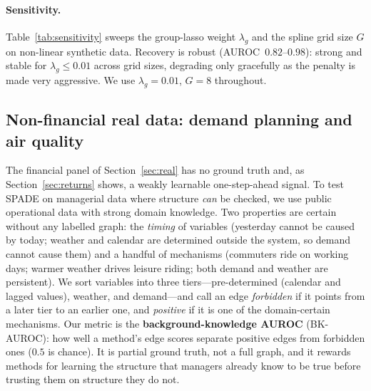 \paragraph{Sensitivity.}
\label{sec:sensitivity}
Table~\ref{tab:sensitivity} sweeps the group-lasso weight $\lambda_g$ and the
spline grid size $G$ on non-linear synthetic data. Recovery is robust
(AUROC~$0.82$--$0.98$): strong and stable for $\lambda_g\!\le\!0.01$ across grid
sizes, degrading only gracefully as the penalty is made very aggressive. We use
$\lambda_g{=}0.01$, $G{=}8$ throughout.

\begin{table}[t]
\centering
\caption{Sensitivity of SPADE to the group-lasso weight $\lambda_g$ and spline
grid size $G$ on non-linear synthetic data (mean over 3 seeds).}
\label{tab:sensitivity}
\end{table}

\subsection{Non-financial real data: demand planning and air quality}
\label{sec:bike}

The financial panel of Section~\ref{sec:real} has no ground truth and, as
Section~\ref{sec:returns} shows, a weakly learnable one-step-ahead signal. To
test SPADE on managerial data where structure \emph{can} be checked, we use public
operational data with strong domain knowledge. Two properties are certain without
any labelled graph: the \emph{timing} of variables (yesterday cannot be caused by
today; weather and calendar are determined outside the system, so demand cannot
cause them) and a handful of mechanisms (commuters ride on working days;
warmer weather drives leisure riding; both demand and weather are persistent).
We sort variables into three tiers---pre-determined (calendar and lagged
values), weather, and demand---and call an edge \emph{forbidden} if it points
from a later tier to an earlier one, and \emph{positive} if it is one of the
domain-certain mechanisms. Our metric is the \textbf{background-knowledge AUROC}
(BK-AUROC): how well a method's edge scores separate positive edges from
forbidden ones ($0.5$ is chance). It is partial ground truth, not a full graph,
and it rewards methods for learning the structure that managers already know to
be true before trusting them on structure they do not.

